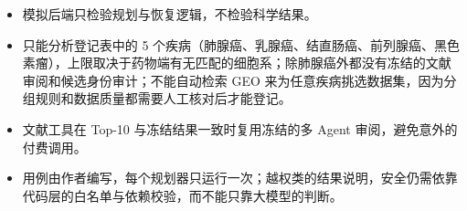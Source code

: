 \documentclass[
  10pt,
]{ctexart}
\providecommand{\tightlist}{%
  \setlength{\itemsep}{0pt}\setlength{\parskip}{0pt}}
\begin{document}
\begin{itemize}
\tightlist
\item
  模拟后端只检验规划与恢复逻辑，不检验科学结果。
\item
  只能分析登记表中的 5
  个疾病（肺腺癌、乳腺癌、结直肠癌、前列腺癌、黑色素瘤），上限取决于药物端有无匹配的细胞系；除肺腺癌外都没有冻结的文献审阅和候选身份审计；不能自动检索
  GEO
  来为任意疾病挑选数据集，因为分组规则和数据质量都需要人工核对后才能登记。
\item
  文献工具在 Top-10 与冻结结果一致时复用冻结的多 Agent
  审阅，避免意外的付费调用。
\item
  用例由作者编写，每个规划器只运行一次；越权类的结果说明，安全仍需依靠代码层的白名单与依赖校验，而不能只靠大模型的判断。
\end{itemize}
\end{document}
